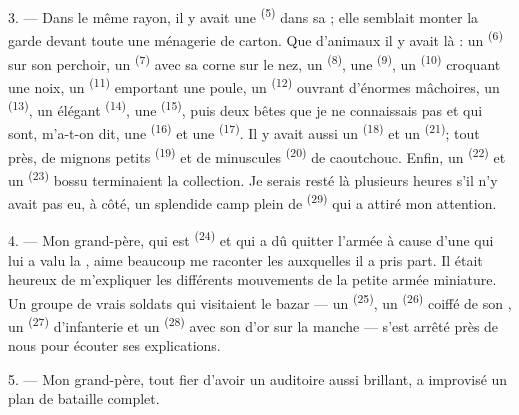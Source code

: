 \VUsaut{3.0mm}
\VUsaut{2.6mm}

3. --- Dans le même rayon, il y avait une  \textsuperscript{(5)}
dans sa ; elle semblait monter la garde devant toute une
ménagerie de carton. Que d'animaux il y avait là : un 
\textsuperscript{(6)} sur son perchoir, un 
\textsuperscript{(7)} avec sa corne sur le nez, un 
\textsuperscript{(8)}, une  \textsuperscript{(9)}, un
 \textsuperscript{(10)} croquant une noix, un 
\textsuperscript{(11)} emportant une poule, un 
\textsuperscript{(12)} ouvrant d'énormes mâchoires, un 
\textsuperscript{(13)}, un élégant  \textsuperscript{(14)}, une
 \textsuperscript{(15)}, puis deux bêtes que je ne connaissais
pas et qui sont, m'a-t-on dit, une  \textsuperscript{(16)} et une
 \textsuperscript{(17)}. Il y avait aussi un 
\textsuperscript{(18)} et un  \textsuperscript{(21)}; tout près, de
mignons petits  \textsuperscript{(19)} et de minuscules
 \textsuperscript{(20)} de caoutchouc. Enfin, un
 \textsuperscript{(22)} et un 
\textsuperscript{(23)} bossu terminaient la collection. Je serais resté là
plusieurs heures s'il n'y avait pas eu, à côté, un splendide camp plein de
 \textsuperscript{(29)} qui a attiré mon attention.

\VUsaut{4.0mm}
\VUsaut{2.8mm}

4. --- Mon grand-père, qui est  \textsuperscript{(24)} et qui a
dû quitter l'armée à cause d'une  qui lui a valu la
, aime beaucoup me raconter les 
auxquelles il a pris part. Il était heureux de m'expliquer les différents
mouvements de la petite armée miniature. Un groupe de vrais soldats qui
visitaient le bazar — un  \textsuperscript{(25)}, un
 \textsuperscript{(26)} coiffé de son , un
 \textsuperscript{(27)} d'infanterie et un  \textsuperscript{(28)} avec son  d'or sur la manche
— s'est arrêté près de nous pour écouter ses explications.

5. --- Mon grand-père, tout fier d'avoir un auditoire aussi brillant, a
improvisé un plan de bataille complet.

